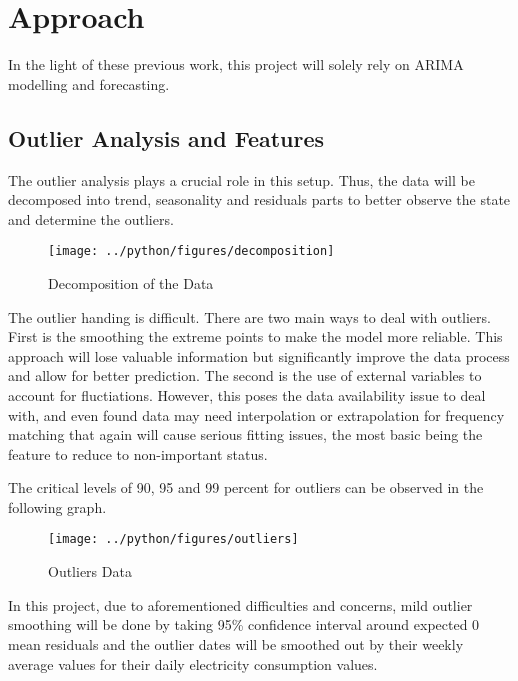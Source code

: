 \documentclass[11pt, a4paper, leqno]{article}
\begin{document}
\section{Approach} %
\label{sec:appro}

In the light of these previous work, this project will solely rely on ARIMA modelling and forecasting.


\subsection{Outlier Analysis and Features}
\label{subsec:outlanaly}


The outlier analysis plays a crucial role in this setup. Thus, the data will be decomposed into trend, seasonality and residuals parts to better observe the state and determine the outliers.


\begin{figure}[H]

    \centering
    \texttt{[image: ../python/figures/decomposition]}

    \caption{Decomposition of the Data}
    \label{fig:daily_consumption}

\end{figure}


The outlier handing is difficult. There are two main ways to deal with outliers. First is the smoothing the extreme points to make the model more reliable. This approach will lose valuable information but significantly improve the data process and allow for better prediction. The second is the use of external variables to account for fluctiations. However, this poses the data availability issue to deal with, and even found data may need interpolation or extrapolation for frequency matching that again will cause serious fitting issues, the most basic being the feature to reduce to non-important status.


The critical levels of 90, 95 and 99 percent for outliers can be observed in the following graph.

\begin{figure}[H]

    \centering
    \texttt{[image: ../python/figures/outliers]}

    \caption{Outliers Data}
    \label{fig:daily_consumption}

\end{figure}

In this project, due to aforementioned difficulties and concerns, mild outlier smoothing will be done by taking 95\% confidence interval around expected 0 mean residuals and the outlier dates will be smoothed out by their weekly average values for their daily electricity consumption values.
\end{document}
